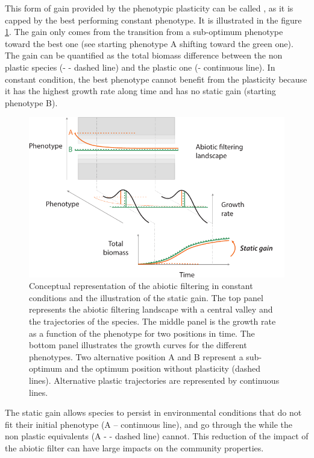 This form of gain provided by the phenotypic plasticity can be called , as it is capped by the best performing constant phenotype. It is illustrated in the figure \ref{fig:filter}. The gain only comes from the transition from a sub-optimum phenotype toward the best one (see  \textcolor{myOrange}{starting phenotype A}  shifting toward the green one). The gain can be quantified as the total biomass difference between the non plastic species (- - dashed line) and the plastic one (- continuous line).  In constant condition, the best phenotype cannot benefit from the plasticity because it has the highest growth rate along time and has no static gain (\textcolor{myGreen}{starting phenotype B}). 


\begin{figure}
\includegraphics[width = \textwidth]{./2_PP/Figures/Rain/filtering.pdf}
\caption[Abiotic filtering in constant conditions]{Conceptual representation of the abiotic filtering in constant conditions and the illustration of the static gain. The top panel represents the abiotic filtering landscape with a central valley and the trajectories of the species. The middle panel is the growth rate as a function of the phenotype for two positions in time. The bottom panel illustrates the growth curves for the different phenotypes. Two alternative position \textcolor{myOrange}{A} and \textcolor{myGreen}{B} represent a sub-optimum and the optimum position without plasticity (dashed lines). Alternative plastic trajectories are represented by continuous lines. }\label{fig:filter}
\end{figure}

The static gain allows species to persist in environmental conditions that do not fit their initial phenotype (\textcolor{myOrange}{A -- continuous line}), and go through the  while the non plastic equivalents (\textcolor{myOrange}{A - - dashed line}) cannot. This reduction of the impact of the abiotic filter can have large impacts on the community properties.

